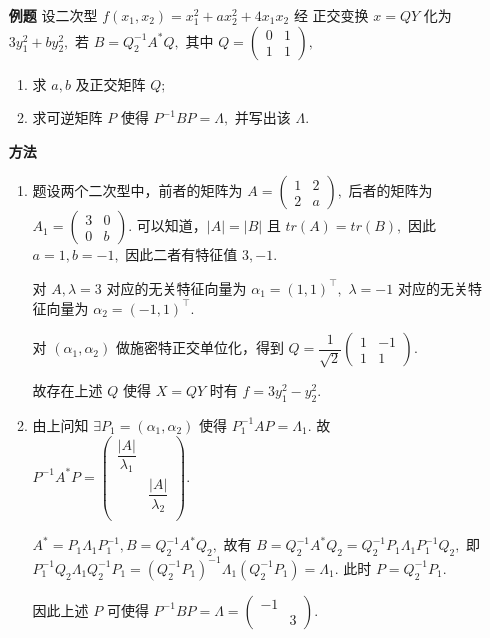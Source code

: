 \begin{itemize}
    \item[\textbf{例题}] 设二次型 $ f(x_1,x_2) = x_1^2 + ax_2^2 + 4x_1x_2 $ 经
    正交变换 $ x = QY $ 化为 $ 3y^2_1 + by^2_2, $ 若 $ B = Q_2^{-1}A^*Q, $ 
    其中 $ Q = \begin{pmatrix}
        0&1\\1&1
    \end{pmatrix}, $ 
    \begin{enumerate}[label = \Roman*.]
        \item 求 $ a,b $ 及正交矩阵 $ Q; $ 
        \item 求可逆矩阵 $ P $ 使得 $ P^{-1}BP = \Lambda, $ 并写出该 $ \Lambda. $ 
    \end{enumerate}
    \item[\textbf{方法}]
    \begin{enumerate}[label = \Roman*.]
        \item 题设两个二次型中，前者的矩阵为 $ A = \begin{pmatrix}
            1&2\\2&a
        \end{pmatrix}, $ 后者的矩阵为 $ A_1 = \begin{pmatrix}
            3&0\\0&b
        \end{pmatrix}. $ 
        可以知道，$ |A| = |B| $ 且 $ tr(A) = tr(B), $ 因此
        $ a = 1,b = -1, $ 因此二者有特征值 $ 3,-1. $ 

        对 $ A, \lambda = 3 $ 对应的无关特征向量为 $ \alpha_1 = (1,1)^\top, $ 
        $\lambda = -1 $ 对应的无关特征向量为 $ \alpha_2 = (-1,1)^\top. $ 

        对 $ (\alpha_1,\alpha_2) $ 做施密特正交单位化，得到 $ Q = \dfrac{1}{\sqrt 2}\begin{pmatrix}
            1&-1\\1&1
        \end{pmatrix}. $ 

        故存在上述 $ Q $ 使得 $ X = QY $ 时有 $ f = 3y_1^2 - y_2^2. $
        \item 由上问知 $ \exists P_1 = (\alpha_1,\alpha_2) $ 使得 $ P_1^{-1}AP = \Lambda_1. $ 
        故 $ P^{-1}A^*P = \begin{pmatrix}
            \dfrac{|A|}{\lambda_1}&\\&\dfrac{|A|}{\lambda_2}\\
        \end{pmatrix}. $ 

        $ A^* = P_1\Lambda_1P_1^{-1}, B = Q_2^{-1}A^*Q_2, $ 
        故有 $ B = Q_2^{-1}A^*Q_2 = Q_2^{-1}P_1\Lambda_1P_1^{-1}Q_2, $ 
        即 $ P_1^{-1}Q_2\Lambda_1Q_2^{-1}P_1 = (Q_2^{-1}P_1)^{-1}\Lambda_1(Q_2^{-1}P_1) = \Lambda_1. $ 
        此时 $ P = Q_2^{-1}P_1. $ 

        因此上述 $ P $ 可使得 $ P^{-1}BP = \Lambda = \begin{pmatrix}
            -1&\\&3
        \end{pmatrix}. $ 
    \end{enumerate}
\end{itemize}

